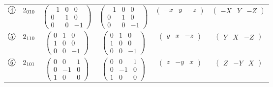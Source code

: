 \documentclass[fleqn,10pt,landscape]{jsarticle}
\begin{document}
\begin{center}
\begin{longtable}{lcccc}
$ {\ooalign{\hfil\resizebox{.8\width}{\height}{4}\hfil\crcr\raise.1ex\hbox{\large$\bigcirc$}}}\quad 2{}_{010} $ & $ \begin{pmatrix} -1 & 0 & 0 \\ 0 & 1 & 0 \\ 0 & 0 & -1 \end{pmatrix} $ & $ \begin{pmatrix} -1 & 0 & 0 \\ 0 & 1 & 0 \\ 0 & 0 & -1 \end{pmatrix} $ & $ \begin{pmatrix} - x & y & - z \end{pmatrix} $ & $ \begin{pmatrix} - X & Y & - Z \end{pmatrix} $ \\
$ {\ooalign{\hfil\resizebox{.8\width}{\height}{5}\hfil\crcr\raise.1ex\hbox{\large$\bigcirc$}}}\quad 2{}_{110} $ & $ \begin{pmatrix} 0 & 1 & 0 \\ 1 & 0 & 0 \\ 0 & 0 & -1 \end{pmatrix} $ & $ \begin{pmatrix} 0 & 1 & 0 \\ 1 & 0 & 0 \\ 0 & 0 & -1 \end{pmatrix} $ & $ \begin{pmatrix} y & x & - z \end{pmatrix} $ & $ \begin{pmatrix} Y & X & - Z \end{pmatrix} $ \\
$ {\ooalign{\hfil\resizebox{.8\width}{\height}{6}\hfil\crcr\raise.1ex\hbox{\large$\bigcirc$}}}\quad 2{}_{101} $ & $ \begin{pmatrix} 0 & 0 & 1 \\ 0 & -1 & 0 \\ 1 & 0 & 0 \end{pmatrix} $ & $ \begin{pmatrix} 0 & 0 & 1 \\ 0 & -1 & 0 \\ 1 & 0 & 0 \end{pmatrix} $ & $ \begin{pmatrix} z & - y & x \end{pmatrix} $ & $ \begin{pmatrix} Z & - Y & X \end{pmatrix} $ \\

\end{longtable}
\end{center}
\end{document}
